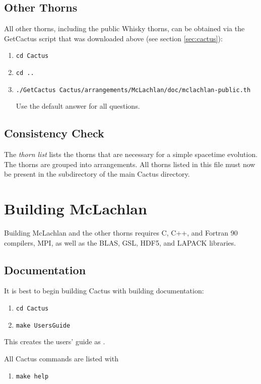 \subsection{Other Thorns}

All other thorns, including the public Whisky thorns, can be obtained
via the GetCactus script that was downloaded above (see section
\ref{sec:cactus}):

\begin{enumerate}
\item\verb+cd Cactus+
\item\verb+cd ..+
\item\verb+./GetCactus Cactus/arrangements/McLachlan/doc/mclachlan-public.th+
  
  Use the default answer for all questions.
\end{enumerate}

\subsection{Consistency Check}

The \emph{thorn list}  lists the thorns
that are necessary for a simple spacetime evolution.  The thorns are
grouped into arrangements.  All thorns listed in this file must now be
present in the  subdirectory of the main Cactus
directory.



\section{Building McLachlan}

Building McLachlan and the other thorns requires C, C++, and Fortran
90 compilers, MPI, as well as the BLAS, GSL, HDF5, and LAPACK
libraries.

\subsection{Documentation}

It is best to begin building Cactus with building documentation:
\begin{enumerate}
\item\verb+cd Cactus+
\item\verb+make UsersGuide+
\end{enumerate}
This creates the users' guide as .

All Cactus commands are listed with
\begin{enumerate}
\item\verb+make help+
\end{enumerate}

